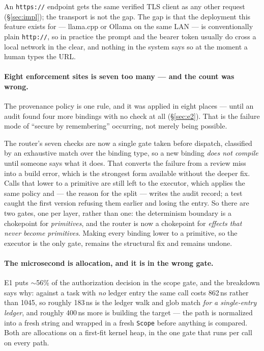 \documentclass[11pt]{article}
\newcommand{\code}[1]{\texttt{#1}}
\begin{document}
An \code{https://} endpoint gets the same verified TLS client as any other
request (\S\ref{sec:impl}); the transport is not the gap. The gap is that the
deployment this feature exists for --- llama.cpp or Ollama on the same LAN --- is
conventionally plain \code{http://}, so in practice the prompt and the bearer
token usually do cross a local network in the clear, and nothing in the system
says so at the moment a human types the URL.

\paragraph{Eight enforcement sites is seven too many --- and the count was wrong.} The provenance policy is
one rule, and it was applied in eight places --- until an audit found four more
bindings with no check at all (\S\ref{sec:e2}). That is the failure mode of
``secure by remembering'' occurring, not merely being possible.

The router's seven checks are now a single gate taken before dispatch, classified
by an exhaustive match over the binding type, so a new binding \emph{does not
compile} until someone says what it does. That converts the failure from a
review miss into a build error, which is the strongest form available without
the deeper fix. Calls that lower to a primitive are still left to the executor,
which applies the same policy and --- the reason for the split --- writes the
audit record; a test caught the first version refusing them earlier and losing
the entry. So there are two gates, one per layer, rather than one: the
determinism boundary is a chokepoint for \emph{primitives}, and the router is
now a chokepoint for \emph{effects that never become primitives}. Making every
binding lower to a primitive, so the executor is the only gate, remains the
structural fix and remains undone.

\paragraph{The microsecond is allocation, and it is in the wrong gate.}
\label{sec:limits-cost}
E1 puts $\sim$56\% of the authorization decision in the scope gate, and the
breakdown says why: against a task with \emph{no} ledger entry the same call
costs 862\,ns rather than 1045, so roughly 183\,ns is the ledger walk and glob
match \emph{for a single-entry ledger}, and roughly 400\,ns more is building the
target --- the path is normalized into a fresh string and wrapped in a fresh
\code{Scope} before anything is compared. Both are allocations on a first-fit
kernel heap, in the one gate that runs per call on every path.
\end{document}
